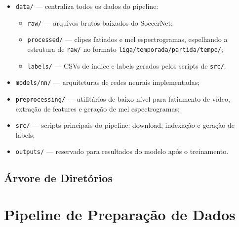 \documentclass[12pt, a4paper]{article}
\begin{document}
\begin{itemize}
    \item \texttt{data/} — centraliza todos os dados do pipeline:
    \begin{itemize}
        \item \texttt{raw/} — arquivos brutos baixados do SoccerNet;
        \item \texttt{processed/} — clipes fatiados e mel espectrogramas, espelhando a estrutura de \texttt{raw/} no formato \texttt{liga/temporada/partida/tempo/};
        \item \texttt{labels/} — CSVs de índice e labels gerados pelos scripts de \texttt{src/}.
    \end{itemize}
    \item \texttt{models/nn/} — arquiteturas de redes neurais implementadas;
    \item \texttt{preprocessing/} — utilitários de baixo nível para fatiamento de vídeo, extração de features e geração de mel espectrogramas;
    \item \texttt{src/} — scripts principais do pipeline: download, indexação e geração de labels;
    \item \texttt{outputs/} — reservado para resultados do modelo após o treinamento.
\end{itemize}

\newpage

\subsection{Árvore de Diretórios}

\bigskip


\newpage
\section{Pipeline de Preparação de Dados}
\end{document}
